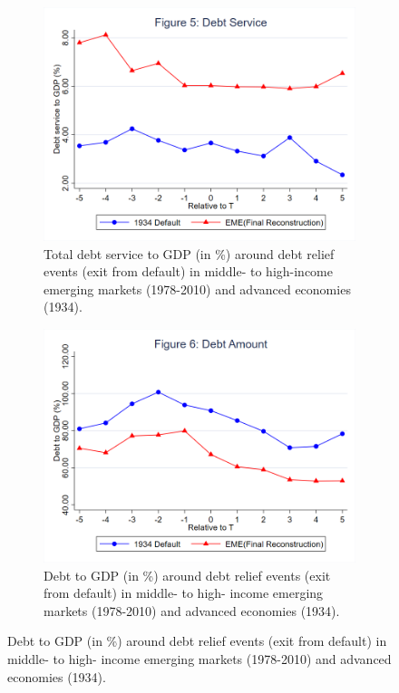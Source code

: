 \begin{figure}[ht!]
    \centering
    \begin{subfigure}[b]{0.48\textwidth}
        \centering
        \includegraphics[width=\textwidth]{figures/Figure5_DebtService_Comparison.png}
        \caption{Total debt service to GDP (in \%) around debt relief events (exit from default) in
        middle- to high-income emerging markets (1978-2010) and advanced economies (1934).}
        \label{fig:5}
    \end{subfigure}
    \hfill
    \begin{subfigure}[b]{0.48\textwidth}
        \centering
        \includegraphics[width=\textwidth]{figures/Figure6_DebtStock_Comparison.png}
        \caption{Debt to GDP (in \%) around debt relief events (exit from default) in middle- to high-
income emerging markets (1978-2010) and advanced economies (1934).}
        \label{fig:6}
    \end{subfigure}
\end{figure}

